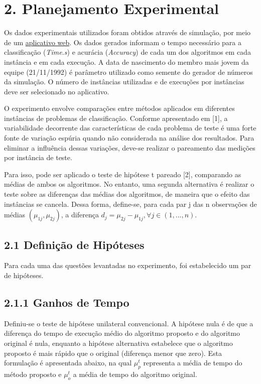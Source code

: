 \documentclass[]{article}
\begin{document}
\section{2. Planejamento Experimental}\label{planejamento-experimental}

Os dados experimentais utilizados foram obtidos através de simulação,
por meio de um
\href{http://orcslab.cpdee.ufmg.br/3838/classdata}{aplicativo web}. Os
dados gerados informam o tempo necessário para a classificação
(\emph{Time.s}) e acurácia (\emph{Accuracy}) de cada um dos algoritmos
em cada instância e em cada execução. A data de nascimento do membro
mais jovem da equipe (21/11/1992) é parâmetro utilizado como semente do
gerador de números da simulação. O número de instâncias utilizadas e de
execuções por instâncias deve ser selecionado no aplicativo.

O experimento envolve comparações entre métodos aplicados em diferentes
instâncias de problemas de classificação. Conforme apresentado em
{[}1{]}, a variabilidade decorrente das características de cada problema
de teste é uma forte fonte de variação espúria quando não considerada na
análise dos resultados. Para eliminar a influência dessas variações,
deve-se realizar o pareamento das medições por instância de teste.

Para isso, pode ser aplicado o teste de hipótese t pareado {[}2{]},
comparando as médias de ambos os algoritmos. No entanto, uma segunda
alternativa é realizar o teste sobre as diferenças das médias dos
algoritmos, de maneira que o efeito das instâncias se cancela. Dessa
forma, define-se, para cada par j das n observações de médias
\((\mu_{1j}, \mu_{2j})\), a diferença
\(d_j = \mu_{2j} - \mu_{1j}, \forall j \in (1,...,n)\).

\subsection{2.1 Definição de Hipóteses}\label{definicao-de-hipoteses}

Para cada uma das questões levantadas no experimento, foi estabelecido
um par de hipóteses.

\subsection{2.1.1 Ganhos de Tempo}\label{ganhos-de-tempo}

Definiu-se o teste de hipótese unilateral convencional. A hipótese nula
é de que a diferença do tempo de execução médio do algoritmo proposto e
do algoritmo original é nula, enquanto a hipótese alternativa estabelece
que o algoritmo proposto é mais rápido que o original (diferença menor
que zero). Esta formulação é apresentada abaixo, na qual \(\mu_p^t\)
representa a média de tempo do método proposto e \(\mu_o^t\) a média de
tempo do algoritmo original.
\end{document}
